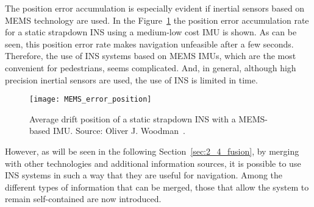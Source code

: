The position error accumulation is especially evident if inertial sensors based on MEMS technology are used.
In the Figure~\ref{fig:MEMS_error_position} the position error accumulation rate for a static strapdown INS using a medium-low cost IMU is shown.
As can be seen, this position error rate makes navigation unfeasible after a few seconds.
Therefore, the use of INS systems based on MEMS IMUs, which are the most convenient for pedestrians, seems complicated.
And, in general, although high precision inertial sensors are used, the use of INS is limited in time.
\begin{figure}[!t]
    \centering
	\texttt{[image: MEMS\_error\_position]}    	
	\caption[Average drift position of a static strapdown INS with a MEMS-based IMU]{Average drift position of a static strapdown INS with a MEMS-based IMU. Source: Oliver J. Woodman~\cite{woodman_introduction_2007}.}
	\label{fig:MEMS_error_position}
\end{figure}
However, as will be seen in the following Section~\ref{sec:2_4_fusion}, by merging with other technologies and additional information sources, it is possible to use INS systems in such a way that they are useful for navigation.
Among the different types of information that can be merged, those that allow the system to remain self-contained are now introduced.
